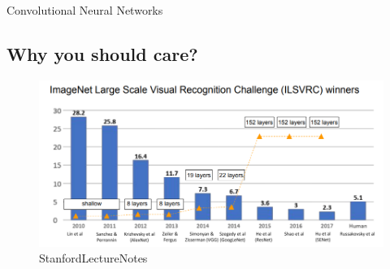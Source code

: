 \documentclass[11pt]{article}
\makeatletter
\def\maxwidth{\ifdim\Gin@nat@width>\linewidth\linewidth
    \else\Gin@nat@width\fi}
\let\Oldincludegraphics\includegraphics
\renewcommand{\includegraphics}[1]{\Oldincludegraphics[width=.8\maxwidth]{#1}}
\makeatother
\begin{document}
    Convolutional Neural Networks

\hypertarget{why-you-should-care}{%
\subsection{Why you should care?}\label{why-you-should-care}}

\begin{figure}
\centering
\includegraphics{pres_imgs/image_net.png}
\caption{StanfordLectureNotes}
\end{figure}


    
    
    
    
\end{document}
